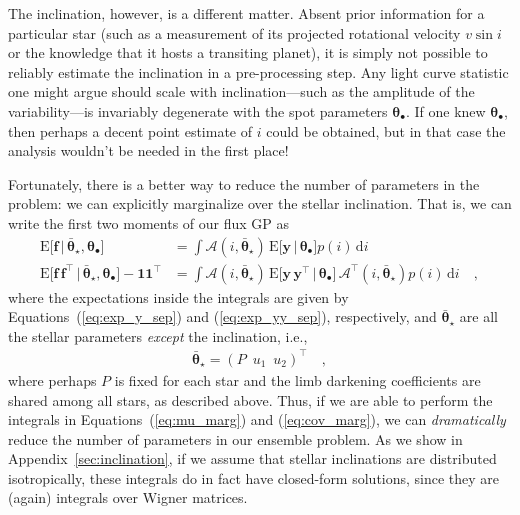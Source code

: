 \documentclass[modern]{aastex62}
\begin{document}
The inclination, however, is a different matter. Absent prior information
for a particular star (such as a measurement of its projected rotational
velocity $v\sin i$ or the knowledge that it hosts a transiting planet), it
is simply not possible to reliably estimate the inclination in a
pre-processing step. Any light curve statistic one might argue should scale
with inclination---such as the amplitude of the variability---is invariably
degenerate with the spot parameters $\pmb{\theta}_\bullet$. If one knew
$\pmb{\theta}_\bullet$, then perhaps a decent point estimate of $i$ could
be obtained, but in that case the analysis wouldn't be needed in the first place!
%

Fortunately, there is a better way to reduce the number of parameters in
the problem: we can explicitly marginalize over the stellar inclination.
That is, we can write the first two moments of our flux GP as
%
\begin{align}
    \label{eq:mu_marg}
    \mathrm{E} \Big[ \mathbf{f} \, \Big| \, \bar{\pmb{\theta}}_\star, \pmb{\theta}_\bullet \Big]
     & =
    \int
    \pmb{\mathcal{A}}(i, \bar{\pmb{\theta}}_\star) \,
    \mathrm{E} \Big[ \mathbf{y} \, \Big| \, \pmb{\theta}_\bullet \Big]
    p(i) \, \mathrm{d}i \\
    \label{eq:cov_marg}
    \mathrm{E} \Big[ \mathbf{f} \, \mathbf{f}^\top \, \Big| \, \bar{\pmb{\theta}}_\star, \pmb{\theta}_\bullet \Big]
    - \mathbf{1} \mathbf{1}^\top
     & =
    \int
    \pmb{\mathcal{A}}(i, \bar{\pmb{\theta}}_\star) \,
    \mathrm{E} \Big[ \mathbf{y} \, \mathbf{y}^\top \, \Big| \, \pmb{\theta}_\bullet \Big] \,
    \pmb{\mathcal{A}}^\top(i, \bar{\pmb{\theta}}_\star)
    p(i) \, \mathrm{d}i
    \quad,
\end{align}
%
where the expectations inside the integrals are given by
Equations~(\ref{eq:exp_y_sep}) and (\ref{eq:exp_yy_sep}), respectively, and
$\bar{\pmb{\theta}}_\star$ are all the stellar parameters \emph{except}
the inclination, i.e.,
%
\begin{align}
    \bar{\pmb{\theta}}_\star = \left(
    P \,\,\,
    u_1 \,\,\,
    u_2
    \right)^\top
    \quad,
\end{align}
%
where perhaps $P$ is fixed for each star and the limb darkening coefficients
are shared among all stars, as described above.
%
Thus, if we are able to perform the integrals in Equations~(\ref{eq:mu_marg})
and (\ref{eq:cov_marg}), we can \emph{dramatically} reduce the number of
parameters in our ensemble problem.
%
As we show in Appendix~\ref{sec:inclination}, if we assume that stellar
inclinations are distributed isotropically, these integrals
do in fact have closed-form solutions,
since they are (again) integrals over Wigner matrices.
%
\end{document}
